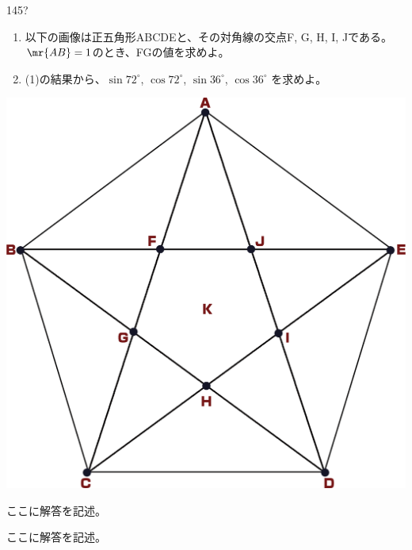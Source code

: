 \begin{thm}{145}{\hosi ?}{}
 \begin{enumerate}
  \item 以下の画像は正五角形ABCDEと、その対角線の交点F, G, H, I, Jである。$\mr{AB}=1$のとき、FGの値を求めよ。
  \item (1)の結果から、$\sin 72^\circ$, $\cos 72^\circ$, $\sin 36^\circ$, $\cos 36^\circ$ を求めよ。
 \end{enumerate}
 \begin{center}
  \includegraphics[bb=0 0 1080 1054,width=0.7\linewidth]{../problems/Q_145/Q_145.png}
 \end{center}
\end{thm}

ここに解答を記述。

ここに解答を記述。